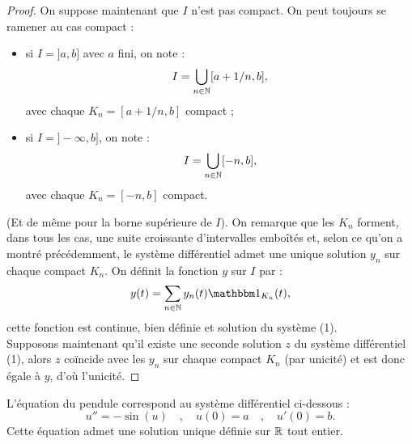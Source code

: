 \begin{proof}
On suppose maintenant que $I$ n'est pas compact. On peut toujours se ramener au cas compact :
\begin{itemize}
\item si $I = ]a, b]$ avec $a$ fini, on note :
\[ I = \bigcup_{n \in \mathbb{N}} [a + 1/n , b], \]
avec chaque $K_n = [a + 1/n , b]$ compact ;
\item si $I= ]-\infty, b]$, on note :
\[ I = \bigcup_{n \in \mathbb{N}} [-n , b], \]
avec chaque $K_n = [-n , b]$ compact.
\end{itemize}
(Et de même pour la borne supérieure de $I$). 
On remarque que les $K_n$ forment, dans tous les cas, une suite croissante d'intervalles emboîtés 
et, selon ce qu'on a montré précédemment, le système différentiel admet une unique solution $y_n$ sur chaque compact $K_n$.
On définit la fonction $y$ sur $I$ par :
\[ y(t) = \sum_{n \in \N} y_n(t) \ind_{K_n}(t) , \] 
cette fonction est continue, bien définie et solution du système (1). \\
Supposons maintenant qu'il existe une seconde solution $z$ du système différentiel (1), alors $z$ coïncide avec les $y_n$ sur chaque
compact $K_n$ (par unicité) et est donc égale à $y$, d'où l'unicité.
\end{proof}

\begin{appl}
L'équation du pendule correspond au système différentiel ci-dessous :
\begin{equation}
u'' = - \sin(u) \quad , \quad u(0) = a \quad , \quad u'(0) = b . 
\end{equation}
Cette équation admet une solution unique définie sur $\mathbb{R}$ tout entier.
\end{appl}

